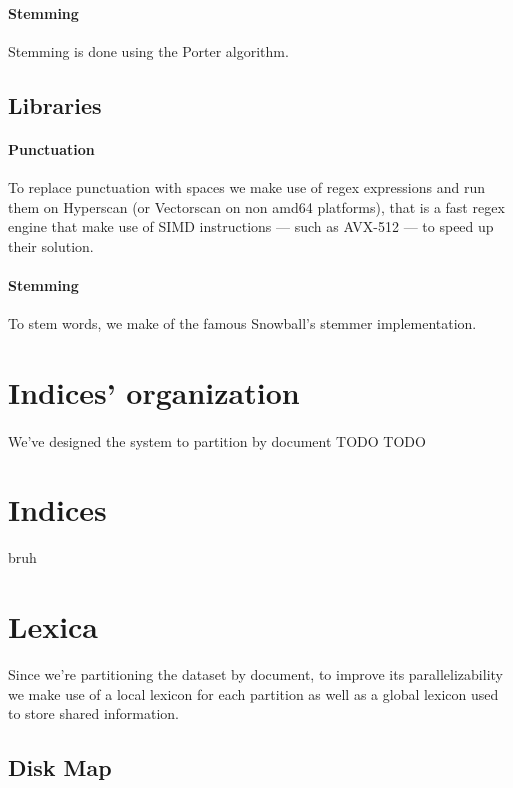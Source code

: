 \paragraph{Stemming}
Stemming is done using the Porter algorithm.

\subsection{Libraries}

\paragraph{Punctuation}
To replace punctuation with spaces we make use of regex expressions and run them on Hyperscan (or Vectorscan on non amd64 platforms), that is a fast regex engine that make use of SIMD instructions --- such as AVX-512 --- to speed up their solution.

\paragraph{Stemming}
To stem words, we make of the famous Snowball's stemmer implementation.

\section{Indices' organization}

\paragraph{}
We've designed the system to partition by document TODO TODO

\section{Indices}

bruh

\section{Lexica}

Since we're partitioning the dataset by document, to improve its parallelizability we make use of a local lexicon for each partition as well as a global lexicon used to store shared information.

\subsection{Disk Map}

